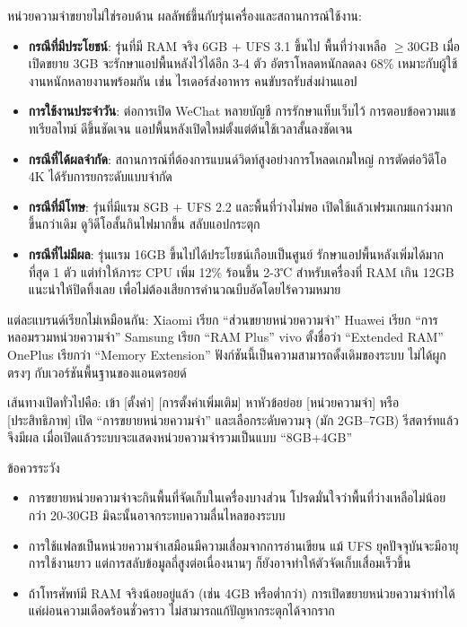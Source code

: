 
หน่วยความจำขยายไม่ใช่รอบด้าน ผลลัพธ์ขึ้นกับรุ่นเครื่องและสถานการณ์ใช้งาน:

\begin{itemize}
  \item \textbf{กรณีที่มีประโยชน์}: รุ่นที่มี RAM จริง 6GB + UFS 3.1 ขึ้นไป พื้นที่ว่างเหลือ $\geq$30GB เมื่อเปิดขยาย 3GB จะรักษาแอปพื้นหลังไว้ได้อีก 3-4 ตัว อัตราโหลดหนักลดลง 68\% เหมาะกับผู้ใช้งานหนักหลายงานพร้อมกัน เช่น ไรเดอร์ส่งอาหาร คนขับรถรับส่งผ่านแอป
  \item \textbf{การใช้งานประจำวัน}: ต่อการเปิด WeChat หลายบัญชี การรักษาแท็บเว็บไว้ การตอบข้อความแชทเรียลไทม์ ดีขึ้นชัดเจน แอปพื้นหลังเปิดใหม่ตั้งแต่ต้นใช้เวลาสั้นลงชัดเจน
  \item \textbf{กรณีที่ได้ผลจำกัด}: สถานการณ์ที่ต้องการแบนด์วิดท์สูงอย่างการโหลดเกมใหญ่ การตัดต่อวิดีโอ 4K ได้รับการยกระดับแบบจำกัด
  \item \textbf{กรณีที่มีโทษ}: รุ่นที่มีแรม 8GB + UFS 2.2 และพื้นที่ว่างไม่พอ เปิดใช้แล้วเฟรมเกมแกว่งมากขึ้นกว่าเดิม ดูวิดีโอสั้นกินไฟมากขึ้น สลับแอปกระตุก
  \item \textbf{กรณีที่ไม่มีผล}: รุ่นแรม 16GB ขึ้นไปได้ประโยชน์เกือบเป็นศูนย์ รักษาแอปพื้นหลังเพิ่มได้มากที่สุด 1 ตัว แต่ทำให้ภาระ CPU เพิ่ม 12\% ร้อนขึ้น 2-3℃ สำหรับเครื่องที่ RAM เกิน 12GB แนะนำให้ปิดทิ้งเลย เพื่อไม่ต้องเสียการคำนวณบีบอัดโดยไร้ความหมาย
\end{itemize}


แต่ละแบรนด์เรียกไม่เหมือนกัน: Xiaomi เรียก “ส่วนขยายหน่วยความจำ” Huawei เรียก “การหลอมรวมหน่วยความจำ” Samsung เรียก “RAM Plus” vivo ตั้งชื่อว่า “Extended RAM” OnePlus เรียกว่า “Memory Extension” ฟังก์ชันนี้เป็นความสามารถดั้งเดิมของระบบ ไม่ได้ผูกตรงๆ กับเวอร์ชันพื้นฐานของแอนดรอยด์

เส้นทางเปิดทั่วไปคือ: เข้า [ตั้งค่า] [การตั้งค่าเพิ่มเติม] หาหัวข้อย่อย [หน่วยความจำ] หรือ [ประสิทธิภาพ] เปิด “การขยายหน่วยความจำ” และเลือกระดับความจุ (มัก 2GB–7GB) รีสตาร์ทแล้วจึงมีผล เมื่อเปิดแล้วระบบจะแสดงหน่วยความจำรวมเป็นแบบ “8GB+4GB”

\begin{tcbwarn}{ข้อควรระวัง}
\begin{itemize}
  \item การขยายหน่วยความจำจะกินพื้นที่จัดเก็บในเครื่องบางส่วน โปรดมั่นใจว่าพื้นที่ว่างเหลือไม่น้อยกว่า 20-30GB มิฉะนั้นอาจกระทบความลื่นไหลของระบบ
  \item การใช้แฟลชเป็นหน่วยความจำเสมือนมีความเสื่อมจากการอ่านเขียน แม้ UFS ยุคปัจจุบันจะมีอายุการใช้งานยาว แต่การสลับข้อมูลถี่สูงต่อเนื่องนานๆ ก็ยังอาจทำให้ตัวจัดเก็บเสื่อมเร็วขึ้น
  \item ถ้าโทรศัพท์มี RAM จริงน้อยอยู่แล้ว (เช่น 4GB หรือต่ำกว่า) การเปิดขยายหน่วยความจำทำได้แค่ผ่อนความเดือดร้อนชั่วคราว ไม่สามารถแก้ปัญหากระตุกได้จากราก
\end{itemize}

\end{tcbwarn}

